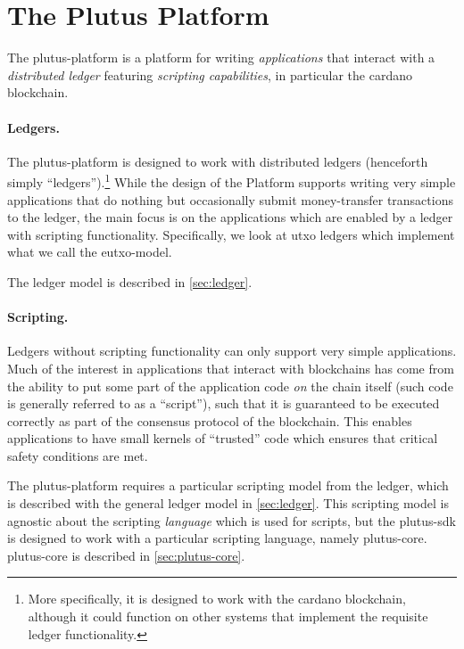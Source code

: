 \section{The Plutus Platform}

The \gls{plutus-platform} is a platform for writing \emph{applications} that interact with a \emph{distributed ledger} featuring \emph{scripting capabilities}, in particular the \gls{cardano} blockchain.

\paragraph{Ledgers.}
The \gls{plutus-platform} is designed to work with distributed ledgers (henceforth simply ``ledgers'').\footnote{
More specifically, it is designed to work with the \gls{cardano} blockchain, although it could function on other systems that implement the requisite ledger functionality.
}
While the design of the Platform supports writing very simple applications that do nothing but occasionally submit money-transfer transactions to the ledger,
 the main focus is on the applications which are enabled by a ledger with scripting functionality.
Specifically, we look at \gls{utxo} ledgers which implement what we call the \gls{eutxo-model}.

The ledger model is described in \cref{sec:ledger}.

\paragraph{Scripting.}
Ledgers without scripting functionality can only support very simple applications.
Much of the interest in applications that interact with blockchains has come from the ability to put some part of the application code \emph{on} the chain itself (such code is generally referred to as a ``\gls{script}''), such that it is guaranteed to be executed correctly as part of the consensus protocol of the blockchain.
This enables applications to have small kernels of ``trusted'' code which ensures that critical safety conditions are met.

The \gls{plutus-platform} requires a particular scripting model from the ledger, which is described with the general ledger model in \cref{sec:ledger}.
This scripting model is agnostic about the scripting \emph{language} which is used for \glspl{script}, but the \gls{plutus-sdk} is designed to work with a particular scripting language, namely \gls{plutus-core}. \Gls{plutus-core} is described in \cref{sec:plutus-core}.


